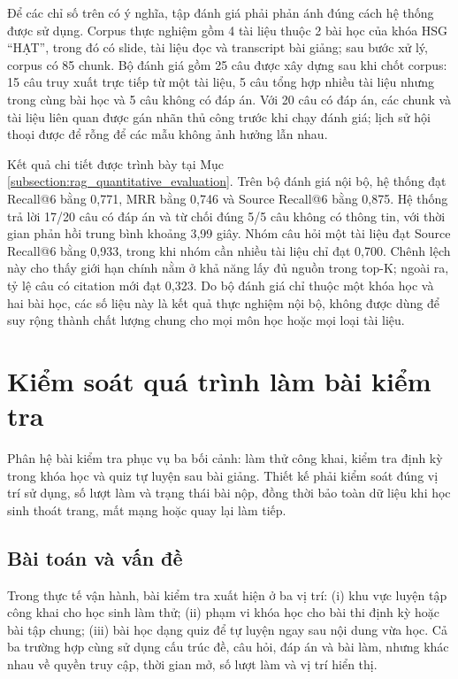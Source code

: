 \documentclass[../DoAn.tex]{subfiles}
\begin{document}
Để các chỉ số trên có ý nghĩa, tập đánh giá phải phản ánh đúng cách hệ thống được sử dụng. Corpus thực nghiệm gồm 4 tài liệu thuộc 2 bài học của khóa HSG ``HẠT'', trong đó có slide, tài liệu đọc và transcript bài giảng; sau bước xử lý, corpus có 85 chunk. Bộ đánh giá gồm 25 câu được xây dựng sau khi chốt corpus: 15 câu truy xuất trực tiếp từ một tài liệu, 5 câu tổng hợp nhiều tài liệu nhưng trong cùng bài học và 5 câu không có đáp án. Với 20 câu có đáp án, các chunk và tài liệu liên quan được gán nhãn thủ công trước khi chạy đánh giá; lịch sử hội thoại được để rỗng để các mẫu không ảnh hưởng lẫn nhau.

Kết quả chi tiết được trình bày tại Mục \ref{subsection:rag_quantitative_evaluation}. Trên bộ đánh giá nội bộ, hệ thống đạt Recall@6 bằng 0,771, MRR bằng 0,746 và Source Recall@6 bằng 0,875. Hệ thống trả lời 17/20 câu có đáp án và từ chối đúng 5/5 câu không có thông tin, với thời gian phản hồi trung bình khoảng 3,99 giây. Nhóm câu hỏi một tài liệu đạt Source Recall@6 bằng 0,933, trong khi nhóm cần nhiều tài liệu chỉ đạt 0,700. Chênh lệch này cho thấy giới hạn chính nằm ở khả năng lấy đủ nguồn trong top-K; ngoài ra, tỷ lệ câu có citation mới đạt 0,323. Do bộ đánh giá chỉ thuộc một khóa học và hai bài học, các số liệu này là kết quả thực nghiệm nội bộ, không được dùng để suy rộng thành chất lượng chung cho mọi môn học hoặc mọi loại tài liệu.

\section{Kiểm soát quá trình làm bài kiểm tra}
\label{section:5.2}

Phân hệ bài kiểm tra phục vụ ba bối cảnh: làm thử công khai, kiểm tra định kỳ trong khóa học và quiz tự luyện sau bài giảng. Thiết kế phải kiểm soát đúng vị trí sử dụng, số lượt làm và trạng thái bài nộp, đồng thời bảo toàn dữ liệu khi học sinh thoát trang, mất mạng hoặc quay lại làm tiếp.

\subsection{Bài toán và vấn đề}
\label{section:5.2.1}

Trong thực tế vận hành, bài kiểm tra xuất hiện ở ba vị trí: (i) khu vực luyện tập công khai cho học sinh làm thử; (ii) phạm vi khóa học cho bài thi định kỳ hoặc bài tập chung; (iii) bài học dạng quiz để tự luyện ngay sau nội dung vừa học. Cả ba trường hợp cùng sử dụng cấu trúc đề, câu hỏi, đáp án và bài làm, nhưng khác nhau về quyền truy cập, thời gian mở, số lượt làm và vị trí hiển thị.
\end{document}
